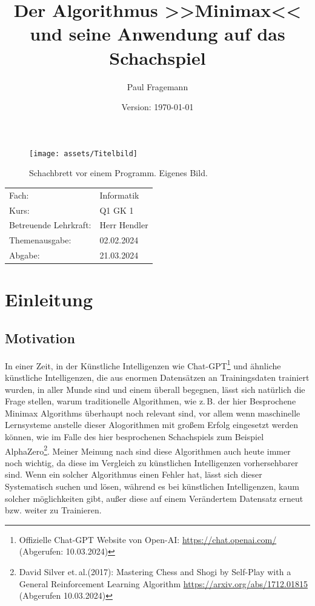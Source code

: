 \documentclass[12pt, a4paper, oneside, openright]{article}
\title{Der Algorithmus >>Minimax<< und seine Anwendung auf das Schachspiel}
\author{Paul Fragemann}
\date{Version: \today}
\newcommand \zB{z.\,B.\xspace }
\newcommand \bzw{bzw.\xspace }
\newcommand \etal{et.\,al.\xspace }
\begin{document}
\maketitle
\thispagestyle{empty}

\begin{figure}[H]
    \centering
    \texttt{[image: assets/Titelbild]}
    \caption[Schachbrett vor einem Programm]{Schachbrett vor einem Programm. Eigenes Bild.}

    \label{fig:Titelbild}
\end{figure}

\vfill

\noindent
\begin{tabular}{p{4cm}l}
    Fach:                   & Informatik \tabularnewline
    Kurs:                   & Q1 GK 1 \tabularnewline
    Betreuende Lehrkraft:   & Herr Hendler \tabularnewline
    Themenausgabe:          & 02.02.2024 \tabularnewline
    Abgabe:                 & 21.03.2024 \tabularnewline
\end{tabular}

\newpage

\thispagestyle{empty}
\tableofcontents



\newpage
\setcounter{page}{3}
\section{Einleitung}\label{sec:einleitung}
\subsection{Motivation}\label{subsec:motivation}
In einer Zeit, in der Künstliche Intelligenzen wie Chat-GPT\footnote{Offizielle Chat-GPT Website von Open-AI: \url{https://chat.openai.com/} (Abgerufen: 10.03.2024)} und ähnliche künstliche Intelligenzen, die aus enormen Datensätzen an Trainingsdaten trainiert wurden, in aller Munde sind und einem überall begegnen, lässt sich natürlich die Frage stellen, warum traditionelle Algorithmen, wie \zB der hier Besprochene Minimax Algorithms überhaupt noch relevant sind, vor allem wenn maschinelle Lernsysteme anstelle dieser Alogorithmen mit großem Erfolg eingesetzt werden können, wie im Falle des hier besprochenen Schachspiels zum Beispiel AlphaZero\footnote{David Silver \etal (2017): Mastering Chess and Shogi by Self-Play with a General Reinforcement Learning Algorithm \url{https://arxiv.org/abs/1712.01815} (Abgerufen 10.03.2024)}.
Meiner Meinung nach sind diese Algorithmen auch heute immer noch wichtig, da diese im Vergleich zu künstlichen Intelligenzen vorhersehbarer sind.
Wenn ein solcher Algorithmus einen Fehler hat, lässt sich dieser Systematisch suchen und lösen, während es bei künstlichen Intelligenzen, kaum solcher möglichkeiten gibt, außer diese auf einem Verändertem Datensatz erneut \bzw weiter zu Trainieren.
\end{document}
